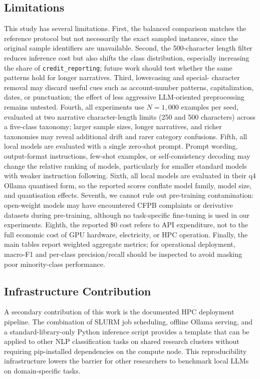 \documentclass[journal]{IEEEtran}
\begin{document}
\subsection{Limitations}

This study has several limitations. First, the balanced comparison
matches the reference protocol but not necessarily the exact sampled
instances, since the original sample identifiers are unavailable.
Second, the 500-character length filter reduces inference cost but
also shifts the class distribution, especially increasing the share of
\texttt{credit\_reporting}; future work should test whether the same
patterns hold for longer narratives. Third, lowercasing and special-
character removal may discard useful cues such as account-number
patterns, capitalization, dates, or punctuation; the effect of less
aggressive LLM-oriented preprocessing remains untested. Fourth, all experiments use $N{=}1{,}000$ examples per seed,
evaluated at two narrative character-length limits (250 and 500
characters) across a five-class taxonomy; larger sample sizes,
longer narratives, and richer taxonomies may reveal additional
drift and rarer category confusions.
Fifth, all local models are evaluated with a single zero-shot prompt.
Prompt wording, output-format instructions, few-shot examples, or
self-consistency decoding may change the relative ranking of models,
particularly for smaller standard models with weaker instruction
following. Sixth, all local models are evaluated in their q4 Ollama
quantised form, so the reported scores conflate model family, model
size, and quantisation effects. Seventh, we cannot rule out pre-training
contamination: open-weight models may have encountered CFPB complaints
or derivative datasets during pre-training, although no task-specific
fine-tuning is used in our experiments. Eighth, the reported \$0 cost
refers to API expenditure, not to the full economic cost of GPU
hardware, electricity, or HPC operation. Finally, the main tables
report weighted aggregate metrics; for operational deployment,
macro-F1 and per-class precision/recall should be inspected to avoid
masking poor minority-class performance.

\subsection{Infrastructure Contribution}

A secondary contribution of this work is the documented HPC
deployment pipeline. The combination of SLURM job scheduling,
offline Ollama serving, and a standard-library-only Python inference
script provides a template that can be applied to other NLP
classification tasks on shared research clusters without requiring
pip-installed dependencies on the compute node. This reproducibility
infrastructure lowers the barrier for other researchers to benchmark
local LLMs on domain-specific tasks.
\end{document}
